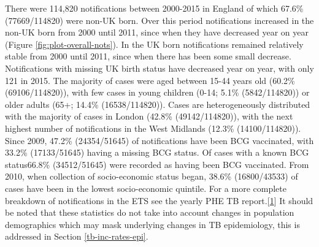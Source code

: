 \documentclass[11pt,twoside]{bristolthesis}
\begin{document}
  There were 114,820 notifications between 2000-2015 in England of which 67.6\% (77669/114820) were non-UK born. Over this period notifications increased in the non-UK born from 2000 until 2011, since when they have decreased year on year (Figure \ref{fig:plot-overall-nots}). In the UK born notifications remained relatively stable from 2000 until 2011, since when there has been some small decrease. Notifications with missing UK birth status have decreased year on year, with only 121 in 2015. The majority of cases were aged between 15-44 years old (60.2\% (69106/114820)), with few cases in young children (0-14; 5.1\% (5842/114820)) or older adults (65+; 14.4\% (16538/114820)). Cases are heterogeneously distributed with the majority of cases in London (42.8\% (49142/114820)), with the next highest number of notifications in the West Midlands (12.3\% (14100/114820)). Since 2009, 47.2\% (24354/51645) of notifications have been BCG vaccinated, with 33.2\% (17133/51645) having a missing BCG status. Of cases with a known BCG status66.8\% (34512/51645) were recorded as having been BCG vaccinated. From 2010, when collection of socio-economic status began, 38.6\% (16800/43533) of cases have been in the lowest socio-economic quintile. For a more complete breakdown of notifications in the ETS see the yearly PHE TB report.{[}\protect\hyperlink{ref-PHE2017}{1}{]} It should be noted that these statistics do not take into account changes in population demographics which may mask underlying changes in TB epidemiology, this is addressed in Section \ref{tb-inc-rates-epi}.
\end{document}
